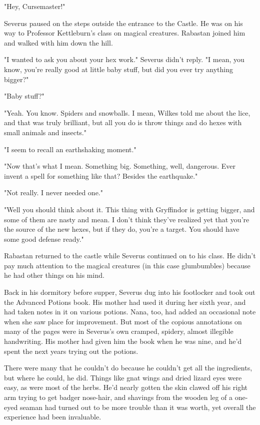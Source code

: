 "Hey, Cursemaster!"

Severus paused on the steps outside the entrance to the Castle. He was on his way to Professor Kettleburn's class on magical creatures. Rabastan joined him and walked with him down the hill.

"I wanted to ask you about your hex work." Severus didn't reply. "I mean, you know, you're really good at little baby stuff, but did you ever try anything bigger?"

"Baby stuff?"

"Yeah. You know. Spiders and snowballs. I mean, Wilkes told me about the lice, and that was truly brilliant, but all you do is throw things and do hexes with small animals and insects."

"I seem to recall an earthshaking moment."

"Now that's what I mean. Something big. Something, well, dangerous. Ever invent a spell for something like that? Besides the earthquake."

"Not really. I never needed one."

"Well you should think about it. This thing with Gryffindor is getting bigger, and some of them are nasty and mean. I don't think they've realized yet that you're the source of the new hexes, but if they do, you're a target. You should have some good defense ready."

Rabastan returned to the castle while Severus continued on to his class. He didn't pay much attention to the magical creatures (in this case glumbumbles) because he had other things on his mind.

Back in his dormitory before supper, Severus dug into his footlocker and took out the Advanced Potions book. His mother had used it during her sixth year, and had taken notes in it on various potions. Nana, too, had added an occasional note when she saw place for improvement. But most of the copious annotations on many of the pages were in Severus's own cramped, spidery, almost illegible handwriting. His mother had given him the book when he was nine, and he'd spent the next years trying out the potions.

There were many that he couldn't do because he couldn't get all the ingredients, but where he could, he did. Things like gnat wings and dried lizard eyes were easy, as were most of the herbs. He'd nearly gotten the skin clawed off his right arm trying to get badger nose-hair, and shavings from the wooden leg of a one-eyed seaman had turned out to be more trouble than it was worth, yet overall the experience had been invaluable.

